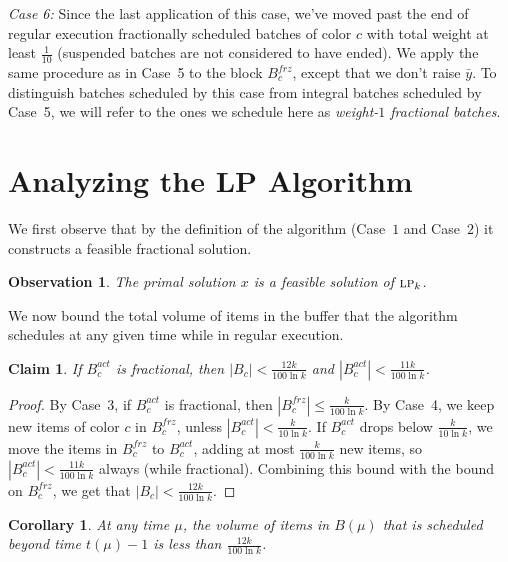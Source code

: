 \documentclass[12pt]{article}
\newtheorem{corollary}[theorem]{Corollary}
\newtheorem{claim}[theorem]{Claim}
\newtheorem{observation}[theorem]{Observation}
\newcommand{\LP}{{\hbox{\sc lp}}}
\begin{document}
{\em Case 6:}\/ Since the last application of this case, we've
moved past the end of regular execution fractionally scheduled 
batches of color $c$ with total weight at least $\frac{1}{10}$
(suspended batches are not considered to have ended).
We apply the same procedure as in Case~5 to the block
$B_c^{frz}$, except that we don't raise $\bar{y}$. To
distinguish batches scheduled by this case from integral
batches scheduled by Case~5, we will refer to the ones
we schedule here as {\em weight-$1$ fractional batches}.



\section{Analyzing the LP Algorithm}\label{sec: frac analysis}

We first observe that by the definition of the algorithm
(Case~$1$ and Case~$2$) it constructs a feasible fractional
solution.
\begin{observation}\label{obs: x feasible}
The primal solution $x$ is a feasible solution of $\LP_k$.
\end{observation}

We now bound the total volume of items in the buffer that 
the algorithm schedules at any given time while in regular
execution.

\begin{claim}\label{cl: B_c bound}
If $B_c^{act}$ is fractional, then $|B_c |< \frac{12k}{100\ln k}$
and $|B_c^{act}| < \frac{11k}{100\ln k}$.
\end{claim}

\begin{proof}
By Case~3, if $B_c^{act}$ is fractional, then 
$|B_c^{frz}|\le\frac{k}{100\ln k}$. By Case~4, we keep
new items of color $c$ in $B_c^{frz}$, unless
$|B_c^{act}| < \frac{k}{10\ln k}$. If $B_c^{act}$
drops below $\frac{k}{10\ln k}$, we move the
items in $B_c^{frz}$ to $B_c^{act}$, adding at
most $\frac{k}{100\ln k}$ new items, so
$|B_c^{act}| < \frac{11k}{100\ln k}$ always
(while fractional).
Combining this bound with the bound on
$B_c^{frz}$, we get that 
$|B_c |< \frac{12k}{100\ln k}$.
\end{proof}

\begin{corollary}\label{cor: volume beyond t-1}
At any time $\mu$, the volume of items in $B(\mu)$ 
that is scheduled beyond time $t(\mu)-1$ is less than 
$\frac{12k}{100\ln k}$.
\end{corollary}
\end{document}

